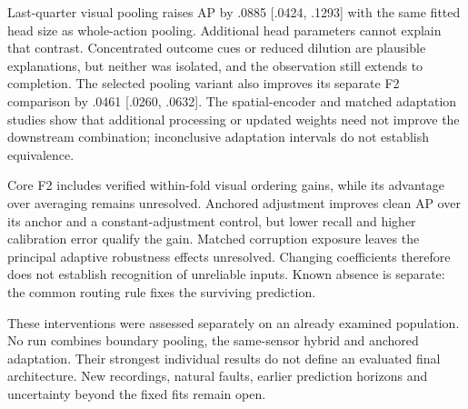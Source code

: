 Last-quarter visual pooling raises AP by .0885 [.0424, .1293] with the same fitted head
size as whole-action pooling. Additional head parameters cannot explain that contrast.
Concentrated outcome cues or reduced dilution are plausible explanations, but neither
was isolated, and the observation still extends to completion. The selected pooling
variant also improves its separate F2 comparison by .0461 [.0260, .0632]. The
spatial-encoder and matched adaptation studies show that additional processing or
updated weights need not improve the downstream combination; inconclusive adaptation
intervals do not establish equivalence.

Core F2 includes verified within-fold visual ordering gains, while its advantage over
averaging remains unresolved. Anchored adjustment improves clean AP over its anchor and
a constant-adjustment control, but lower recall and higher calibration error qualify the
gain. Matched corruption exposure leaves the principal adaptive robustness effects
unresolved. Changing coefficients therefore does not establish recognition of unreliable
inputs. Known absence is separate: the common routing rule fixes the surviving
prediction.

These interventions were assessed separately on an already examined population. No run
combines boundary pooling, the same-sensor hybrid and anchored adaptation. Their
strongest individual results do not define an evaluated final architecture. New
recordings, natural faults, earlier prediction horizons and uncertainty beyond the fixed
fits remain open.
